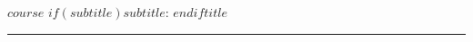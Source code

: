 
\pagestyle{empty}

\begin{center}
\textsc{$course$ $if(subtitle)$$subtitle$: $endif$$title$} \\
\noindent\rule{12cm}{0.4pt}
\end{center}

\vspace{2mm}
